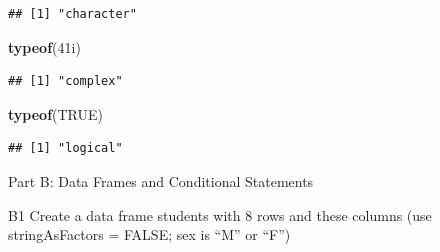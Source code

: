 \documentclass[
]{article}
\newenvironment{Shaded}{\begin{snugshade}}{\end{snugshade}}
\newcommand{\ConstantTok}[1]{\textcolor[rgb]{0.56,0.35,0.01}{#1}}
\newcommand{\DataTypeTok}[1]{\textcolor[rgb]{0.13,0.29,0.53}{#1}}
\newcommand{\DecValTok}[1]{\textcolor[rgb]{0.00,0.00,0.81}{#1}}
\newcommand{\FunctionTok}[1]{\textcolor[rgb]{0.13,0.29,0.53}{\textbf{#1}}}
\newcommand{\NormalTok}[1]{#1}
\begin{document}
\begin{verbatim}
## [1] "character"
\end{verbatim}

\begin{Shaded}
\begin{Highlighting}[]
\FunctionTok{typeof}\NormalTok{(}\DecValTok{41}\DataTypeTok{i}\NormalTok{)}
\end{Highlighting}
\end{Shaded}

\begin{verbatim}
## [1] "complex"
\end{verbatim}

\begin{Shaded}
\begin{Highlighting}[]
\FunctionTok{typeof}\NormalTok{(}\ConstantTok{TRUE}\NormalTok{)}
\end{Highlighting}
\end{Shaded}

\begin{verbatim}
## [1] "logical"
\end{verbatim}

Part B: Data Frames and Conditional Statements

B1 Create a data frame students with 8 rows and these columns (use
stringAsFactors = FALSE; sex is ``M'' or ``F'')
\end{document}
